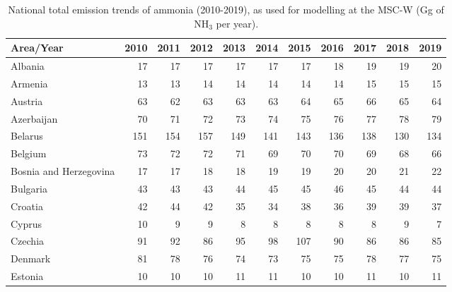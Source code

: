  \begin{table}
 \caption{National total emission trends of  ammonia (2010-2019), as used for modelling at the MSC-W (Gg of NH$_3$ per year).}
 
 \vspace{15pt}
 
 \scriptsize
 \centering
 \begin{tabular}{|l|r|r|r|r|r|r|r|r|r|r|}
 \hline
                     Area/Year&   2010&   2011&   2012&   2013&   2014&   2015&   2016&   2017&   2018&   2019\\\hline\hline
                       Albania&     17&     17&     17&     17&     17&     17&     18&     19&     19&     20\\\hline
                       Armenia&     13&     13&     14&     14&     14&     14&     14&     15&     15&     15\\\hline
                       Austria&     63&     62&     63&     63&     63&     64&     65&     66&     65&     64\\\hline
                    Azerbaijan&     70&     71&     72&     73&     74&     75&     76&     77&     78&     79\\\hline
                       Belarus&    151&    154&    157&    149&    141&    143&    136&    138&    130&    134\\\hline
                       Belgium&     73&     72&     72&     71&     69&     70&     70&     69&     68&     66\\\hline
        Bosnia and Herzegovina&     17&     17&     18&     18&     19&     19&     20&     20&     21&     22\\\hline
                      Bulgaria&     43&     43&     43&     44&     45&     45&     46&     45&     44&     44\\\hline
                       Croatia&     42&     44&     42&     35&     34&     38&     36&     39&     39&     37\\\hline
                        Cyprus&     10&      9&      9&      8&      8&      8&      8&      8&      9&      7\\\hline
                       Czechia&     91&     92&     86&     95&     98&    107&     90&     86&     86&     85\\\hline
                       Denmark&     81&     78&     76&     74&     73&     75&     75&     78&     77&     75\\\hline
                       Estonia&     10&     10&     10&     11&     11&     10&     10&     11&     10&     11\\\hline

\end{tabular}
\end{table}
